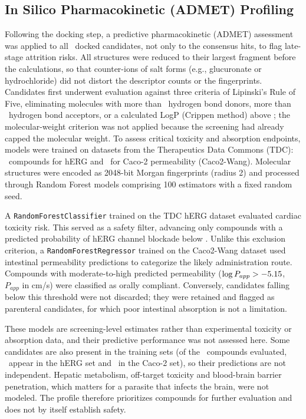 
\subsection{In Silico Pharmacokinetic (ADMET) Profiling}
\label{sec:materials_admet}

Following the docking step, a predictive pharmacokinetic (ADMET) assessment was applied to all \DockNTotal\ docked candidates, not only to the consensus hits, to flag late-stage attrition risks. All structures were reduced to their largest fragment before the calculations, so that counter-ions of salt forms (e.g., glucuronate or hydrochloride) did not distort the descriptor counts or the fingerprints. Candidates first underwent evaluation against three criteria of Lipinski's Rule of Five, eliminating molecules with more than \AdmetLipinskiHBD\ hydrogen bond donors, more than \AdmetLipinskiHBA\ hydrogen bond acceptors, or a calculated LogP (Crippen method) above \AdmetLipinskiLogP; the molecular-weight criterion was not applied because the screening had already capped the molecular weight. To assess critical toxicity and absorption endpoints, models were trained on datasets from the Therapeutics Data Commons (TDC): \AdmetNHergTrain\ compounds for hERG and \AdmetNCacoTrain\ for Caco-2 permeability (Caco2-Wang). Molecular structures were encoded as 2048-bit Morgan fingerprints (radius 2) and processed through Random Forest models comprising 100 estimators with a fixed random seed.

A \texttt{RandomForestClassifier} trained on the TDC hERG dataset evaluated cardiac toxicity risk. This served as a safety filter, advancing only compounds with a predicted probability of hERG channel blockade below \AdmetHergThresh. Unlike this exclusion criterion, a \texttt{RandomForestRegressor} trained on the Caco2-Wang dataset used intestinal permeability predictions to categorize the likely administration route. Compounds with moderate-to-high predicted permeability ($\log P_{app} > -5.15$, $P_{app}$ in cm/s) were classified as orally compliant. Conversely, candidates falling below this threshold were not discarded; they were retained and flagged as parenteral candidates, for which poor intestinal absorption is not a limitation.

These models are screening-level estimates rather than experimental toxicity or absorption data, and their predictive performance was not assessed here. Some candidates are also present in the training sets (of the \AdmetNLipinski\ compounds evaluated, \AdmetOverlapHerg\ appear in the hERG set and \AdmetOverlapCaco\ in the Caco-2 set), so their predictions are not independent. Hepatic metabolism, off-target toxicity and blood-brain barrier penetration, which matters for a parasite that infects the brain, were not modeled. The profile therefore prioritizes compounds for further evaluation and does not by itself establish safety.

